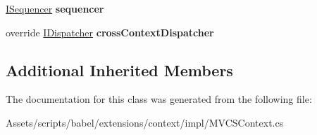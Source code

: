 \begin{DoxyCompactItemize}
\item 
\hypertarget{classbabel_1_1extensions_1_1context_1_1impl_1_1_m_v_c_s_context_ae7ab7658b1e6606ad9ea21526f46ae78}{\hyperlink{interfacebabel_1_1extensions_1_1sequencer_1_1api_1_1_i_sequencer}{I\-Sequencer} {\bfseries sequencer}}\label{classbabel_1_1extensions_1_1context_1_1impl_1_1_m_v_c_s_context_ae7ab7658b1e6606ad9ea21526f46ae78}

\item 
\hypertarget{classbabel_1_1extensions_1_1context_1_1impl_1_1_m_v_c_s_context_a4744aea75dc7602f8bf81d7a24af94cb}{override \hyperlink{interfacebabel_1_1extensions_1_1dispatcher_1_1api_1_1_i_dispatcher}{I\-Dispatcher} {\bfseries cross\-Context\-Dispatcher}}\label{classbabel_1_1extensions_1_1context_1_1impl_1_1_m_v_c_s_context_a4744aea75dc7602f8bf81d7a24af94cb}

\end{DoxyCompactItemize}
\subsection*{Additional Inherited Members}


The documentation for this class was generated from the following file\-:\begin{DoxyCompactItemize}
\item 
Assets/scripts/babel/extensions/context/impl/M\-V\-C\-S\-Context.\-cs\end{DoxyCompactItemize}
